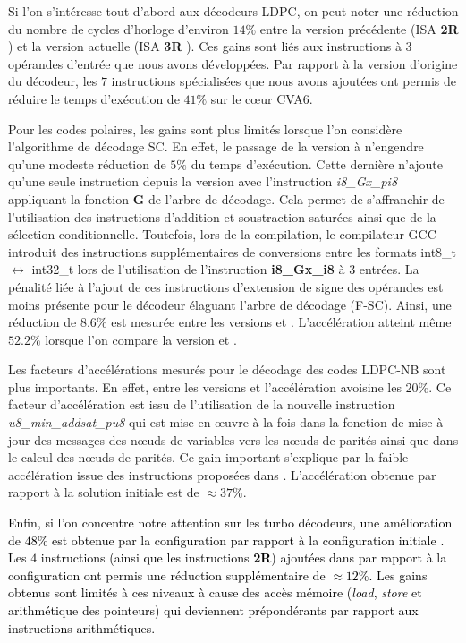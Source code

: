 \documentclass[../main.tex]{subfiles}
\begin{document}
Si l'on s'intéresse tout d'abord aux décodeurs LDPC, on peut noter une réduction du nombre de cycles d'horloge d'environ  $14\%$ entre la version précédente (ISA \textbf{2R} ) et la version actuelle (ISA \textbf{3R} ). 
Ces gains sont liés aux instructions à $3$ opérandes d'entrée que nous avons développées.
Par rapport à la version d'origine du décodeur, les $7$ instructions spécialisées que nous avons ajoutées ont permis de réduire le temps d'exécution de $41\%$ sur le cœur CVA6.


Pour les codes polaires, les gains sont plus limités lorsque l'on considère l'algorithme de décodage SC. 
En effet, le passage de la version  à  n'engendre qu'une modeste réduction de $5\%$ du temps d'exécution. 
Cette dernière n'ajoute qu'une seule instruction depuis la version  avec l'instruction \textit{i8\_Gx\_pi8} appliquant la fonction \textbf{G} de l'arbre de décodage.
Cela permet de s'affranchir de l'utilisation des instructions d'addition et soustraction saturées ainsi que de la sélection conditionnelle. 
Toutefois, lors de la compilation, le compilateur GCC introduit des instructions supplémentaires de conversions entre les formats int8\_t $\leftrightarrow$ int32\_t lors de l'utilisation de l'instruction \textbf{i8\_Gx\_i8} à 3 entrées.
La pénalité liée à l'ajout de ces instructions d'extension de signe des opérandes est moins présente pour le décodeur élaguant l'arbre de décodage (F-SC).
Ainsi, une réduction de $8.6\%$ est mesurée entre les versions  et .
L'accélération atteint même $52.2\%$ lorsque l'on compare la version  et .


Les facteurs d'accélérations mesurés pour le décodage des codes LDPC-NB sont plus importants.
En effet, entre les versions  et  l'accélération avoisine les $20\%$.
Ce facteur d'accélération est issu de l'utilisation de la nouvelle instruction \textit{u8\_min\_addsat\_pu8} qui est mise en œuvre à la fois dans la fonction de mise à jour des messages des nœuds de variables vers les nœuds de parités ainsi que dans le calcul des nœuds de parités.
Ce gain important s'explique par la faible accélération issue des instructions proposées dans .
L'accélération obtenue par rapport à la solution initiale  est de $\approx 37\%$.

\textcolor{black}{Enfin, si l'on concentre notre attention sur les turbo décodeurs, une amélioration de $48\%$ est obtenue par la configuration  par rapport à la configuration initiale . 
Les $4$ instructions (ainsi que les instructions \textbf{2R}) ajoutées dans  par rapport à la configuration  ont permis une réduction supplémentaire de $\approx 12\%$.
Les gains obtenus sont limités à ces niveaux à cause des accès mémoire (\textit{load}, \textit{store} et arithmétique des pointeurs) qui deviennent prépondérants par rapport aux instructions arithmétiques.}
\end{document}
